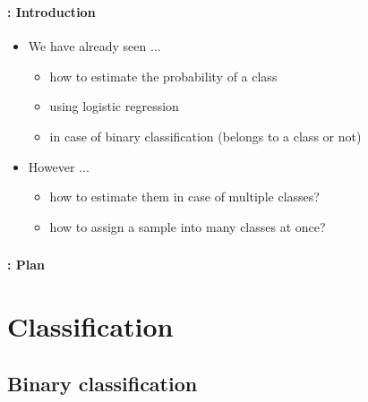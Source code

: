 \documentclass[xcolor=table]{beamer}
\subtitle[Multi-class/label] %
{Multi-class and multi-label classification}
\begin{document}
	
\begin{frame}
	\frametitle{\inserttitle}
	\framesubtitle{\insertshortsubtitle: Introduction}
	
	\begin{itemize}
		\item We have already seen ...
		\begin{itemize}
			\item how to estimate the probability of a class
			\item using logistic regression
			\item in case of binary classification (belongs to a class or not)
		\end{itemize}
		\item However ...
		\begin{itemize}
			\item how to estimate them in case of multiple classes?
			\item how to assign a sample into many classes at once?
		\end{itemize}

	\end{itemize}
\end{frame}


\begin{frame}
	\frametitle{\inserttitle}
	\framesubtitle{\insertshortsubtitle: Plan}
	
	\begin{multicols}{2}
		\tableofcontents
	\end{multicols}
\end{frame}

\section{Classification}

\begin{frame}
	\frametitle{\insertshortsubtitle}
	\framesubtitle{\insertsection}
	
	
\end{frame}

\subsection{Binary classification}
\end{document}

